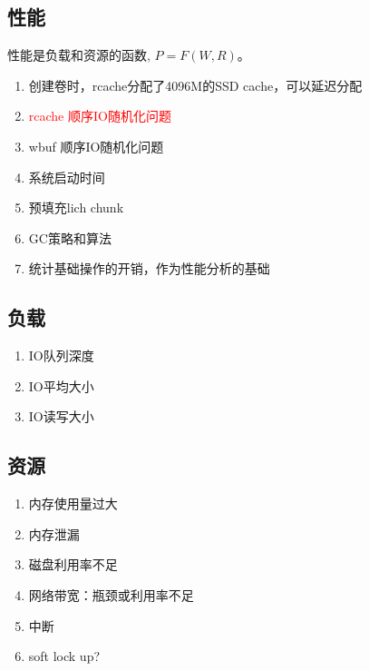 \documentclass[UTF8]{ctexart}
\begin{document}
\subsection{性能}

性能是负载和资源的函数, $P=F(W, R)$。

\begin{tcolorbox}
\begin{enumerate}
    \item 创建卷时，rcache分配了4096M的SSD cache，可以延迟分配
    \item \textcolor{red}{rcache 顺序IO随机化问题}
    \item wbuf 顺序IO随机化问题
    \item 系统启动时间
    \item 预填充lich chunk
    \item GC策略和算法
    \item 统计基础操作的开销，作为性能分析的基础
\end{enumerate}
\end{tcolorbox}

\subsection{负载}

\begin{tcolorbox}
\begin{enumerate}
    \item IO队列深度
    \item IO平均大小
    \item IO读写大小
\end{enumerate}
\end{tcolorbox}

\subsection{资源}

\begin{tcolorbox}
\begin{enumerate}
    \item 内存使用量过大
    \item 内存泄漏
    \item 磁盘利用率不足
    \item 网络带宽：瓶颈或利用率不足
    \item 中断
    \item soft lock up?
\end{enumerate}
\end{tcolorbox}
\end{document}
